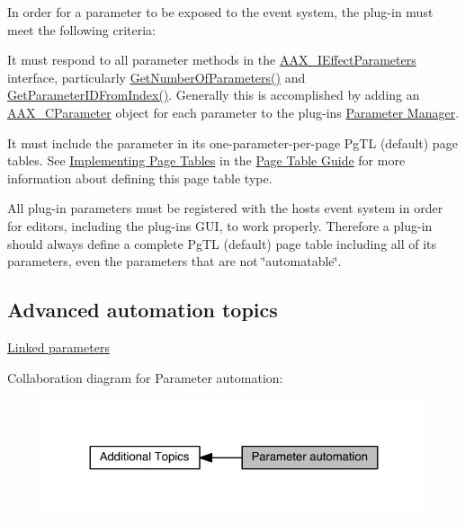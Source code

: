 In order for a parameter to be exposed to the event system, the plug-\/in must meet the following criteria\+: \begin{DoxyItemize}
\item It must respond to all parameter methods in the \hyperlink{a00099}{A\+A\+X\+\_\+\+I\+Effect\+Parameters} interface, particularly \hyperlink{a00061_a8af398b1e308849464aee5a6713a3965}{Get\+Number\+Of\+Parameters()} and \hyperlink{a00061_a5387b83e0f684a5bf0e09b24cae257d9}{Get\+Parameter\+I\+D\+From\+Index()}. Generally this is accomplished by adding an \hyperlink{a00033}{A\+A\+X\+\_\+\+C\+Parameter} object for each parameter to the plug-\/in\textquotesingle{}s \hyperlink{a00344}{Parameter Manager}. \item It must include the parameter in its one-\/parameter-\/per-\/page {\ttfamily \textquotesingle{}Pg\+T\+L\textquotesingle{}} (default) page tables. See \hyperlink{a00363_aax_page_table_guide_05_implementing_page_tables}{Implementing Page Tables} in the \hyperlink{a00363}{Page Table Guide} for more information about defining this page table type.\end{DoxyItemize}
All plug-\/in parameters must be registered with the host\textquotesingle{}s event system in order for editors, including the plug-\/in\textquotesingle{}s G\+U\+I, to work properly. Therefore a plug-\/in should always define a complete {\ttfamily \textquotesingle{}Pg\+T\+L\textquotesingle{}} (default) page table including all of its parameters, even the parameters that are not \char`\"{}automatable\char`\"{}.



 \hypertarget{a00349_parameterAutomation_advanced}{}\subsection{Advanced automation topics}\label{a00349_parameterAutomation_advanced}
 \begin{DoxyItemize}
\item \hyperlink{a00354}{Linked parameters}\end{DoxyItemize}
 Collaboration diagram for Parameter automation\+:
\nopagebreak
\begin{figure}[H]
\begin{center}
\leavevmode
\includegraphics[width=324pt]{a00349}
\end{center}
\end{figure}

